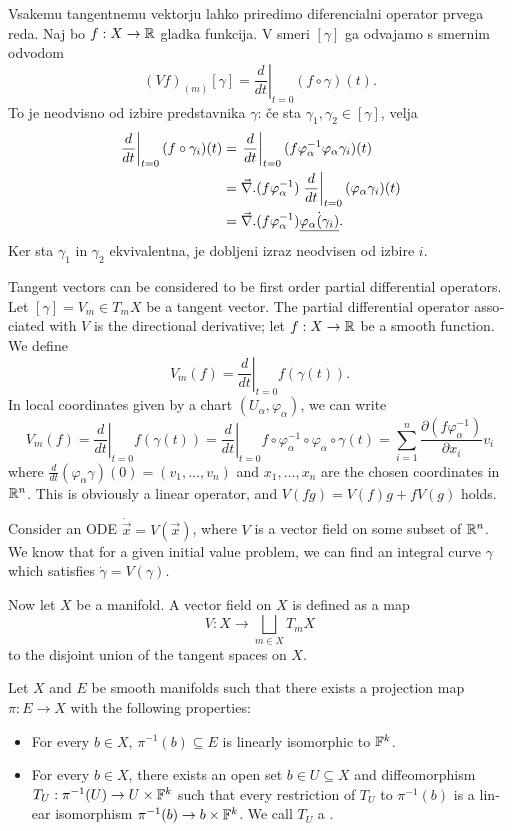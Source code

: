 Vsakemu tangentnemu vektorju lahko priredimo diferencialni operator prvega reda.
Naj bo $f: X \to \mathbb{R}$ gladka funkcija.
V smeri $[\gamma]$ ga odvajamo s smernim odvodom
\[
  (Vf)_{(m)} [\gamma] = \left. \frac{d}{dt} \right|_{t=0} (f \circ \gamma)(t).
\]
To je neodvisno od izbire predstavnika $\gamma$:
če sta $\gamma_1, \gamma_2 \in [\gamma]$, velja
\begin{align*}
  \left. \frac{d}{dt} \right|_{t=0} (f \circ \gamma_i)(t)
  &= \left. \frac{d}{dt} \right|_{t=0} (f \varphi_\alpha^{-1} \varphi_\alpha
  \gamma_i)(t) \\
  &= \vec{\nabla}{} .(f \varphi_\alpha^{-1}) \left. \frac{d}{dt} \right|_{t=0}
  (\varphi_\alpha \gamma_i)(t) \\
  &= \vec{\nabla}{} .(f \varphi_\alpha^{-1}) \dot{\underline{\varphi_\alpha(\gamma_i)}}.
\end{align*}
Ker sta $\gamma_1$ in $\gamma_2$ ekvivalentna, je dobljeni izraz neodvisen od
izbire $i$.

\setmainlanguage{english}

Tangent vectors can be considered to be first order partial differential
operators.
Let $[\gamma] = V_m \in T_m X$ be a tangent vector.
The partial differential operator associated with $V$ is the directional
derivative; let $f: X \to \mathbb{R}$ be a smooth function.
We define
\[
  V_m(f) = \left. \frac{d}{dt} \right|_{t=0} f(\gamma(t)).
\]
In local coordinates given by a chart $(U_\alpha, \varphi_\alpha)$, we can
write
\[
  V_m(f) = \left. \frac{d}{dt} \right|_{t=0} f(\gamma(t))
  = \left. \frac{d}{dt} \right|_{t=0} f \circ \varphi_\alpha^{-1} \circ
  \varphi_\alpha \circ \gamma(t)
  = \sum_{i=1}^n \frac{\partial (f \varphi_\alpha^{-1})}{\partial x_i}
  v_i
\]
where $\frac{d}{dt}(\varphi_\alpha \gamma)(0) = (v_1, \ldots, v_n)$ and $x_1,
\ldots, x_n$ are the chosen coordinates in $\mathbb{R}^n$.
This is obviously a linear operator, and $V(fg) = V(f) g + f V(g)$ holds.


Consider an ODE $\dot{\vec{x}} = V(\vec{x})$, where $V$ is a vector field on
some subset of $\mathbb{R}^n$.
We know that for a given initial value problem, we can find an integral curve
$\gamma$ which satisfies $\dot{\gamma} = V(\gamma)$.

Now let $X$ be a manifold.
A vector field on $X$ is defined as a map
\[
  V: X \to \bigsqcup_{m \in X} T_m X
\]
to the disjoint union of the tangent spaces on $X$.

\begin{definition}
  Let $X$ and $E$ be smooth manifolds such that there exists a projection map
  $\pi: E \to X$ with the following properties:
  \begin{itemize}
  \item For every $b \in X$, $\pi^{-1}(b) \subseteq E$ is linearly isomorphic to
	$\mathbb{F}^k$.
  \item For every $b \in X$, there exists an open set $b \in U \subseteq X$ and
	diffeomorphism $T_U: \pi^{-1}(U) \to U \times \mathbb{F}^k$ such that every
	restriction of $T_U$ to $\pi^{-1}(b)$ is a linear isomorphism $\pi^{-1}(b)
	\to b \times \mathbb{F}^k$.
	We call $T_U$ a .
  \end{itemize}
\end{definition}

